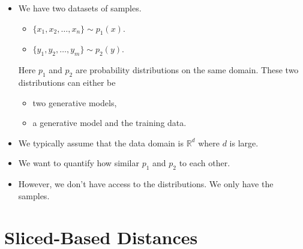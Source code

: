 \documentclass[10pt]{article}
\newcommand{\Real}{\mathbb{R}}
\begin{document}
\begin{itemize}
    \item We have two datasets of samples.
    \begin{itemize}
        \item $\{ x_1, x_2, \dotsc, x_n \} \sim p_1(x)$.
        \item $\{ y_1, y_2, \dotsc, y_m \} \sim p_2(y)$.
    \end{itemize}
    Here $p_1$ and $p_2$ are probability distributions on the same domain.
    These two distributions can either be
    \begin{itemize}
        \item two generative models,
        \item a generative model and the training data.
    \end{itemize}    

    \item We typically assume that the data domain is $\Real^d$ where $d$ is large.

    \item We want to quantify how similar $p_1$ and $p_2$ to each other. 
    
    \item However, we don't have access to the distributions. We only have the samples.
\end{itemize}

\section{Sliced-Based Distances}
\end{document}
